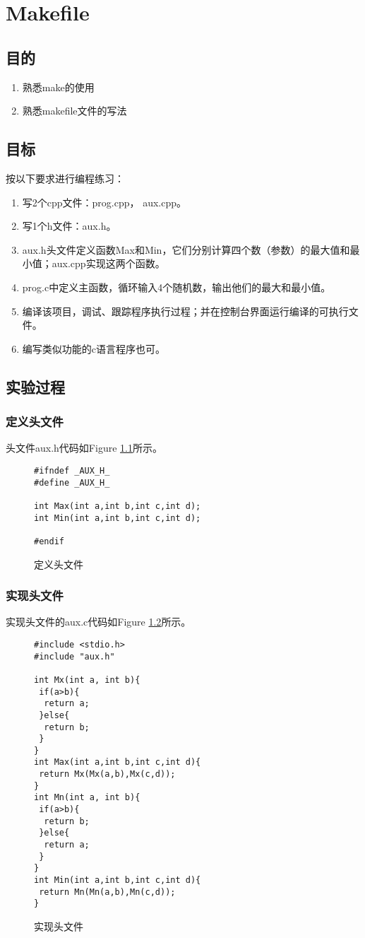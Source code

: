 \chapter{Makefile}
\section{目的}
\begin{enumerate}
\item
熟悉make的使用
\item
熟悉makefile文件的写法
\end{enumerate}
\section{目标}
按以下要求进行编程练习：
\begin{enumerate}
\item
写2个cpp文件：prog.cpp， aux.cpp。
\item
写1个h文件：aux.h。
\item
aux.h头文件定义函数Max和Min，它们分别计算四个数（参数）的最大值和最小值；aux.cpp实现这两个函数。
\item
prog.c中定义主函数，循环输入4个随机数，输出他们的最大和最小值。
\item
编译该项目，调试、跟踪程序执行过程；并在控制台界面运行编译的可执行文件。
\item
编写类似功能的c语言程序也可。
\end{enumerate}
\section{实验过程}
\subsection{定义头文件}
头文件aux.h代码如Figure \ref{Mf1}所示。
\begin{figure}
\begin{verbatim}
#ifndef _AUX_H_
#define _AUX_H_

int Max(int a,int b,int c,int d);
int Min(int a,int b,int c,int d);

#endif
\end{verbatim}
\caption{定义头文件}
\label{Mf1}
\end{figure}

\subsection{实现头文件}
实现头文件的aux.c代码如Figure \ref{Mf2}所示。
\begin{figure}
\begin{verbatim}
#include <stdio.h>
#include "aux.h"

int Mx(int a, int b){
 if(a>b){
  return a;
 }else{
  return b;
 }
}
int Max(int a,int b,int c,int d){
 return Mx(Mx(a,b),Mx(c,d));
}
int Mn(int a, int b){
 if(a>b){
  return b;
 }else{
  return a;
 }
}
int Min(int a,int b,int c,int d){
 return Mn(Mn(a,b),Mn(c,d));
}
\end{verbatim}
\caption{实现头文件}
\label{Mf2}
\end{figure}


